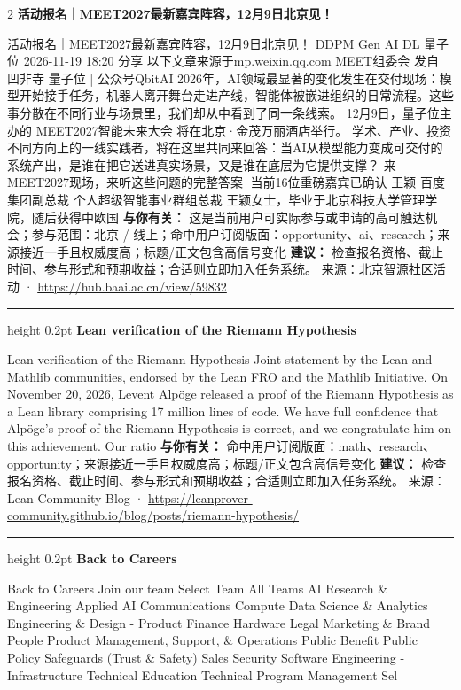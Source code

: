 \documentclass[10.5pt]{ctexart}
\begin{document}
\begin{multicols}{2}
{\large\bfseries 活动报名｜MEET2027最新嘉宾阵容，12月9日北京见！}\par
活动报名｜MEET2027最新嘉宾阵容，12月9日北京见！ DDPM Gen AI DL 量子位 2026-11-19 18:20 分享 以下文章来源于mp.weixin.qq.com MEET组委会 发自 凹非寺 量子位 | 公众号QbitAI 2026年，AI领域最显著的变化发生在交付现场：模型开始接手任务，机器人离开舞台走进产线，智能体被嵌进组织的日常流程。这些事分散在不同行业与场景里，我们却从中看到了同一条线索。 12月9日，量子位主办的 MEET2027智能未来大会 将在北京·金茂万丽酒店举行。 学术、产业、投资 不同方向上的一线实践者，将在这里共同来回答：当AI从模型能力变成可交付的系统产出，是谁在把它送进真实场景，又是谁在底层为它提供支撑？ 来MEET2027现场，来听这些问题的完整答案🔽 当前16位重磅嘉宾已确认 王颖 百度集团副总裁 个人超级智能事业群组总裁 王颖女士，毕业于北京科技大学管理学院，随后获得中欧国
\textbf{与你有关：} 这是当前用户可实际参与或申请的高可触达机会；参与范围：北京 / 线上；命中用户订阅版面：opportunity、ai、research；来源接近一手且权威度高；标题/正文包含高信号变化
\textbf{建议：} 检查报名资格、截止时间、参与形式和预期收益；合适则立即加入任务系统。
{\footnotesize\color{ormuted} 来源：北京智源社区活动 · \url{https://hub.baai.ac.cn/view/59832}}
\vspace{2mm}
\hrule height 0.2pt
\vspace{2mm}
{\large\bfseries Lean verification of the Riemann Hypothesis}\par
Lean verification of the Riemann Hypothesis Joint statement by the Lean and Mathlib communities, endorsed by the Lean FRO and the Mathlib Initiative. On November 20, 2026, Levent Alpöge released a proof of the Riemann Hypothesis as a Lean library comprising 17 million lines of code. We have full confidence that Alpöge's proof of the Riemann Hypothesis is correct, and we congratulate him on this achievement. Our ratio
\textbf{与你有关：} 命中用户订阅版面：math、research、opportunity；来源接近一手且权威度高；标题/正文包含高信号变化
\textbf{建议：} 检查报名资格、截止时间、参与形式和预期收益；合适则立即加入任务系统。
{\footnotesize\color{ormuted} 来源：Lean Community Blog · \url{https://leanprover-community.github.io/blog/posts/riemann-hypothesis/}}
\vspace{2mm}
\hrule height 0.2pt
\vspace{2mm}
{\large\bfseries Back to Careers}\par
Back to Careers Join our team Select Team All Teams AI Research \& Engineering Applied AI Communications Compute Data Science \& Analytics Engineering \& Design - Product Finance Hardware Legal Marketing \& Brand People Product Management, Support, \& Operations Public Benefit Public Policy Safeguards (Trust \& Safety) Sales Security Software Engineering - Infrastructure Technical Education Technical Program Management Sel

\end{multicols}
\end{document}
